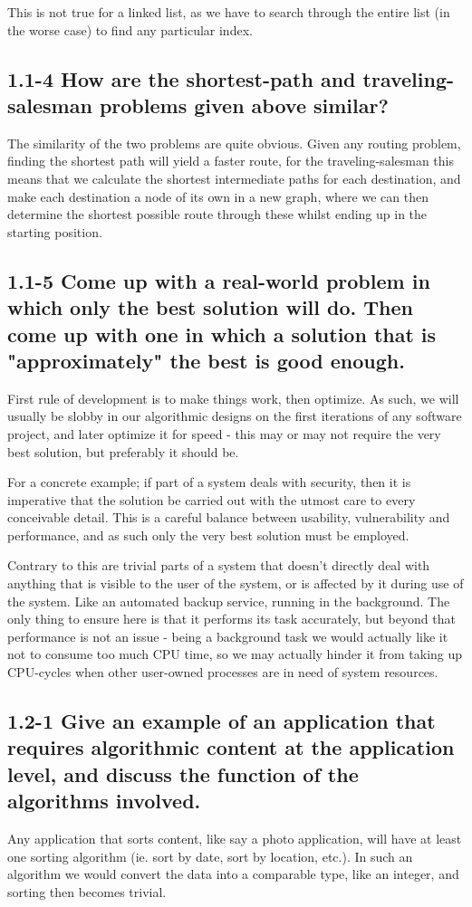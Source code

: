 \documentclass[11pt,english]{article}
\begin{document}
This is not true for a linked list, as we have to search through the entire
list (in the worse case) to find any particular index.

\subsection*{1.1-4 \mdseries How are the shortest-path and traveling-salesman
problems given above similar?}
The similarity of the two problems are quite obvious. Given any routing
problem, finding the shortest path will yield a faster route, for the
traveling-salesman this means that we calculate the shortest intermediate
paths for each destination, and make each destination a node of its own in a
new graph, where we can then determine the shortest possible route through
these whilst ending up in the starting position.

\subsection*{1.1-5 \mdseries Come up with a real-world problem in which only
the best solution will do. Then come up with one in which a solution that is
"approximately" the best is good enough.}
First rule of development is to make things work, then optimize. As such, we
will usually be slobby in our algorithmic designs on the first iterations of
any software project, and later optimize it for speed - this may or may not
require the very best solution, but preferably it should be.

For a concrete example; if part of a system deals with security, then it is
imperative that the solution be carried out with the utmost care to every
conceivable detail. This is a careful balance between usability, vulnerability
and performance, and as such only the very best solution must be employed.

Contrary to this are trivial parts of a system that doesn't directly deal with
anything that is visible to the user of the system, or is affected by it
during use of the system. Like an automated backup service, running in the
background. The only thing to ensure here is that it performs its task
accurately, but beyond that performance is not an issue - being a background
task we would actually like it not to consume too much CPU time, so we may
actually hinder it from taking up CPU-cycles when other user-owned processes
are in need of system resources.

\subsection*{1.2-1 \mdseries Give an example of an application that requires
algorithmic content at the application level, and discuss the function of the
algorithms involved.}
Any application that sorts content, like say a photo application, will have
at least one sorting algorithm (ie. sort by date, sort by location, etc.).
In such an algorithm we would convert the data into a comparable type, like
an integer, and sorting then becomes trivial.
\end{document}
